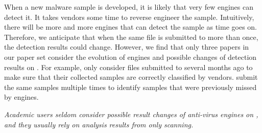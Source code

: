 When a new malware sample is developed, 
it is likely that very few engines can detect it. 
It takes vendors some time to reverse engineer the sample.
Intuitively, there will be more and more engines 
that can detect the sample as time goes on. 
Therefore, we anticipate that when the same file 
is submitted to \vt{} more than once,
the detection results could change. 
However, we find that only three papers in our paper set
consider the evolution of engines and possible 
changes of detection results on \vt{}. 
For example, \citet{neeles} only consider files submitted to \vt{} 
several months ago to make sure that their collected samples 
are correctly classified by \vt{} vendors. 
\citet{wressnegger2017looking} submit the same samples multiple 
times to identify samples that were previously missed by \vt{} engines.  

{\it{
Academic users seldom consider possible 
result changes of anti-virus engines on \vt{}, 
and they usually rely on analysis results from only \vt{} scanning. 
}}


